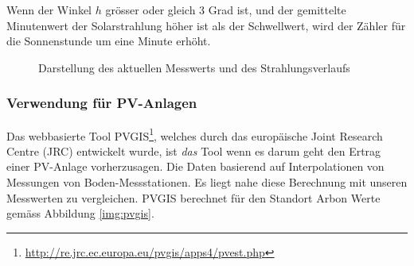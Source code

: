 
\noindent
Wenn der Winkel $h$ grösser oder gleich 3 Grad ist, und der gemittelte Minutenwert der Solarstrahlung höher ist als der Schwellwert, wird der Zähler für die Sonnenstunde um eine Minute erhöht.

%
%

\begin{figure}[htbp]
	\centering
	\caption{Darstellung des aktuellen Messwerts und des Strahlungsverlaufs}
	\label{img:radiation}
\end{figure}



\subsubsection{Verwendung für PV-Anlagen}
Das webbasierte Tool PVGIS\footnote{\url{http://re.jrc.ec.europa.eu/pvgis/apps4/pvest.php}}, welches durch das europäische Joint Research Centre (JRC) entwickelt wurde, ist \textit{das} Tool wenn es darum geht den Ertrag einer PV-Anlage vorherzusagen. Die Daten basierend auf Interpolationen von Messungen von Boden-Messstationen. Es liegt nahe diese Berechnung mit unseren Messwerten zu vergleichen. PVGIS berechnet für den Standort Arbon Werte gemäss Abbildung \ref{img:pvgis}.

